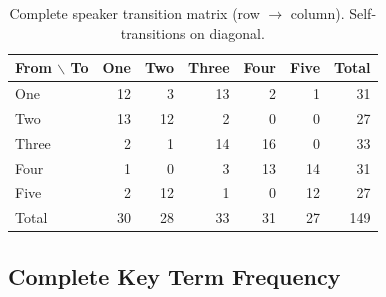 \documentclass[sigconf,nonacm=true]{acmart}
\begin{document}
\begin{table}[h]

\small

\caption{Complete speaker transition matrix (row $\to$ column). Self-transitions on diagonal.}

\label{tab:full_transitions}

\begin{tabular}{lrrrrrr}

\toprule

From $\backslash$ To & One & Two & Three & Four & Five & Total \\

\midrule

One & 12 & 3 & 13 & 2 & 1 & 31 \\

Two & 13 & 12 & 2 & 0 & 0 & 27 \\

Three & 2 & 1 & 14 & 16 & 0 & 33 \\

Four & 1 & 0 & 3 & 13 & 14 & 31 \\

Five & 2 & 12 & 1 & 0 & 12 & 27 \\

\midrule

Total & 30 & 28 & 33 & 31 & 27 & 149 \\

\bottomrule

\end{tabular}

\end{table}

\subsection{Complete Key Term Frequency}
\end{document}
